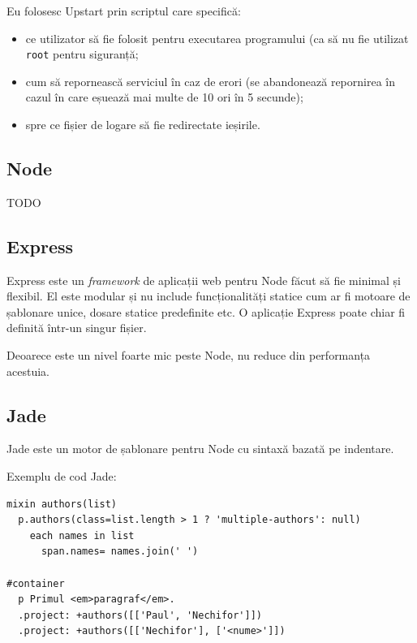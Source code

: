 \documentclass[a4wide,12pt]{report}
\newcommand{\eng}[1]{\emph{#1}} %
\newcommand{\cod}[1]{\texttt{#1}}
\newcommand{\idee}[1]{{\color{red} #1}}
\begin{document}
Eu folosesc Upstart prin scriptul care specifică:

\begin{itemize}

\item ce utilizator să fie folosit pentru executarea programului (ca să nu fie
utilizat \cod{root} pentru siguranță;

\item cum să repornească serviciul în caz de erori (se abandonează repornirea în
cazul în care eșuează mai multe de 10 ori în 5 secunde);

\item spre ce fișier de logare să fie redirectate ieșirile.

\end{itemize}

\subsection{Node}

\idee{TODO}

\subsection{Express}

Express este un \eng{framework} de aplicații web pentru Node făcut să fie
minimal și flexibil. El este modular și nu include funcționalități statice cum
ar fi motoare de șablonare unice, dosare statice predefinite etc. O aplicație
Express poate chiar fi definită într-un singur fișier.

Deoarece este un nivel foarte mic peste Node, nu reduce din performanța
acestuia.

\subsection{Jade}

Jade este un motor de șablonare pentru Node cu sintaxă bazată pe indentare.

Exemplu de cod Jade:

\begin{verbatim}
mixin authors(list)
  p.authors(class=list.length > 1 ? 'multiple-authors': null)
    each names in list
      span.names= names.join(' ')

#container
  p Primul <em>paragraf</em>.
  .project: +authors([['Paul', 'Nechifor']])
  .project: +authors([['Nechifor'], ['<nume>']])
\end{verbatim}
\end{document}
